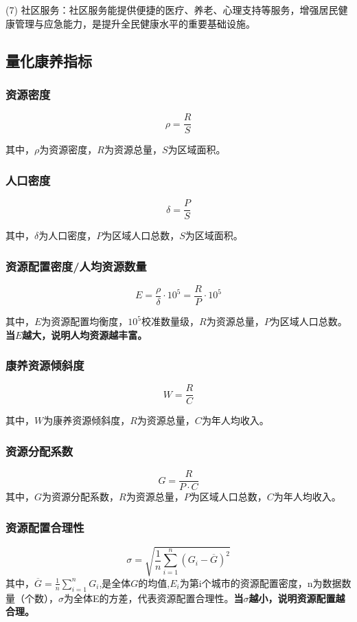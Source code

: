 \documentclass[12pt,a4paper]{article}
\begin{document}
(7) 社区服务：社区服务能提供便捷的医疗、养老、心理支持等服务，增强居民健康管理与应急能力，是提升全民健康水平的重要基础设施。

\subsection{量化康养指标}

\subsubsection{资源密度}
\[
\rho = \frac{R}{S}
\]

其中，$\rho$为资源密度，$R$为资源总量，$S$为区域面积。

\subsubsection{人口密度}
\[
\delta = \frac{P}{S}
\]

其中，$\delta$为人口密度，$P$为区域人口总数，$S$为区域面积。

\subsubsection{资源配置密度/人均资源数量}
\[
E = \frac{\rho}{\delta}\cdot 10^5=\frac{R}{P}\cdot 10^5
\]

其中，$E$为资源配置均衡度，$10^5$校准数量级，$R$为资源总量，$P$为区域人口总数。\textbf{当$E$越大，说明人均资源越丰富。}

\subsubsection{康养资源倾斜度}

\[
W=\frac{R}{C}
\]

其中，$W$为康养资源倾斜度，$R$为资源总量，$C$为年人均收入。

\subsubsection{资源分配系数}

\[
G=\frac{R}{P\cdot C}
\]
其中，$G$为资源分配系数，$R$为资源总量，$P$为区域人口总数，$C$为年人均收入。

\subsubsection{资源配置合理性}
\[
\sigma = \sqrt{\frac{1}{n} \sum_{i=1}^{n}(G_i - \overline{G})^2}
\]
其中，$\overline{G} = \frac{1}{n} \sum_{i=1}^{n}G_i$,是全体$G$的均值,$E_i$为第i个城市的资源配置密度，n为数据数量（个数），$\sigma$为全体E的方差，代表资源配置合理性。\textbf{当$\sigma$越小，说明资源配置越合理。}
\end{document}
